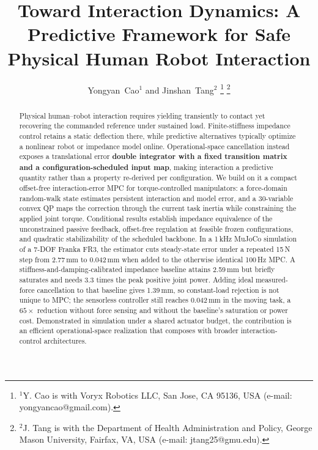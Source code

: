\documentclass[journal]{IEEEtran}
\begin{document}
\title{Toward Interaction Dynamics: A Predictive Framework for Safe Physical Human Robot Interaction}

\author{Yongyan~Cao$^{1}$ and Jinshan~Tang$^{2}$%
\thanks{$^{1}$Y. Cao is with Voryx Robotics LLC, San Jose, CA 95136, USA
(e-mail: yongyancao@gmail.com).}%
\thanks{$^{2}$J. Tang is with the Department of Health Administration and
Policy, George Mason University, Fairfax, VA, USA
(e-mail: jtang25@gmu.edu).}}

\maketitle

\begin{abstract}
Physical human--robot interaction requires yielding transiently to contact yet
recovering the commanded reference under sustained load.  Finite-stiffness
impedance control retains a static deflection there, while predictive
alternatives typically optimize a nonlinear robot or impedance model online.
Operational-space cancellation instead exposes a translational error
\textbf{double integrator with a fixed transition matrix and a
configuration-scheduled input map}, making interaction a predictive quantity
rather than a property re-derived per configuration.  We
build on it a compact offset-free interaction-error MPC for torque-controlled
manipulators: a force-domain random-walk state estimates persistent interaction
and model error, and a 30-variable convex QP maps the correction through the
current task inertia while constraining the applied joint torque.  Conditional
results establish impedance equivalence of the unconstrained passive feedback,
offset-free regulation at feasible frozen configurations, and quadratic
stabilizability of the scheduled backbone.  In a 1\,kHz MuJoCo simulation of a
7-DOF Franka FR3, the estimator cuts steady-state error under a repeated 15\,N
step from 2.77\,mm to 0.042\,mm when added to the otherwise identical 100\,Hz
MPC.  A stiffness-and-damping-calibrated impedance baseline attains 2.59\,mm but
briefly saturates and needs 3.3 times the peak positive joint power.  Adding
ideal measured-force cancellation to that baseline gives 1.39\,mm, so
constant-load rejection is not unique to MPC; the sensorless controller still
reaches 0.042\,mm in the moving task, a $65\times$ reduction without force
sensing and without the baseline's saturation or power cost.  Demonstrated in
simulation under a shared actuator budget, the contribution is an efficient
operational-space realization that composes with broader
interaction-control architectures.
\end{abstract}
\end{document}
